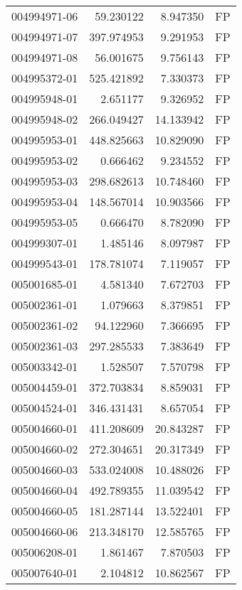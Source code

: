 \begin{tabular}{lrrl}
004994971-06 &   59.230122 &       8.947350 &   FP \\
004994971-07 &  397.974953 &       9.291953 &   FP \\
004994971-08 &   56.001675 &       9.756143 &   FP \\
004995372-01 &  525.421892 &       7.330373 &   FP \\
004995948-01 &    2.651177 &       9.326952 &   FP \\
004995948-02 &  266.049427 &      14.133942 &   FP \\
004995953-01 &  448.825663 &      10.829090 &   FP \\
004995953-02 &    0.666462 &       9.234552 &   FP \\
004995953-03 &  298.682613 &      10.748460 &   FP \\
004995953-04 &  148.567014 &      10.903566 &   FP \\
004995953-05 &    0.666470 &       8.782090 &   FP \\
004999307-01 &    1.485146 &       8.097987 &   FP \\
004999543-01 &  178.781074 &       7.119057 &   FP \\
005001685-01 &    4.581340 &       7.672703 &   FP \\
005002361-01 &    1.079663 &       8.379851 &   FP \\
005002361-02 &   94.122960 &       7.366695 &   FP \\
005002361-03 &  297.285533 &       7.383649 &   FP \\
005003342-01 &    1.528507 &       7.570798 &   FP \\
005004459-01 &  372.703834 &       8.859031 &   FP \\
005004524-01 &  346.431431 &       8.657054 &   FP \\
005004660-01 &  411.208609 &      20.843287 &   FP \\
005004660-02 &  272.304651 &      20.317349 &   FP \\
005004660-03 &  533.024008 &      10.488026 &   FP \\
005004660-04 &  492.789355 &      11.039542 &   FP \\
005004660-05 &  181.287144 &      13.522401 &   FP \\
005004660-06 &  213.348170 &      12.585765 &   FP \\
005006208-01 &    1.861467 &       7.870503 &   FP \\
005007640-01 &    2.104812 &      10.862567 &   FP \\

\end{tabular}
